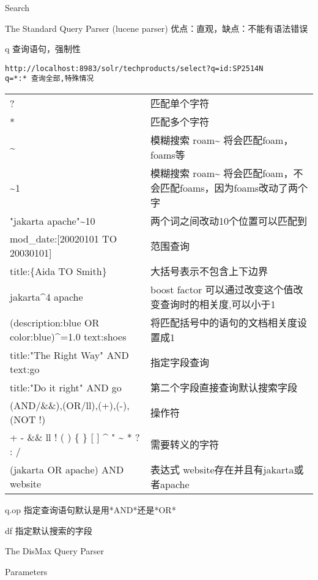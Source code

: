 \documentclass[presentation]{beamer}
\begin{document}
\begin{frame}[fragile,label={sec:org1ccf379}]{Search}
\begin{block}{The Standard Query Parser (lucene parser)}
优点：直观，缺点：不能有语法错误
\begin{block}{q}
查询语句，强制性
\begin{verbatim}
http://localhost:8983/solr/techproducts/select?q=id:SP2514N
q=*:* 查询全部,特殊情况
\end{verbatim}
\begin{center}
\begin{tabular}{ll}
? & 匹配单个字符\\
* & 匹配多个字符\\
\textasciitilde{} & 模糊搜索 roam\textasciitilde{} 将会匹配foam，foams等\\
\textasciitilde{}1 & 模糊搜索 roam\textasciitilde{} 将会匹配foam，不会匹配foams，因为foams改动了两个字\\
"jakarta apache"\textasciitilde{}10 & 两个词之间改动10个位置可以匹配到\\
mod\_date:[20020101 TO 20030101] & 范围查询\\
title:\{Aida TO Smith\} & 大括号表示不包含上下边界\\
jakarta\^{}4 apache & boost factor 可以通过改变这个值改变查询时的相关度,可以小于1\\
(description:blue OR color:blue)\^{}=1.0 text:shoes & 将匹配括号中的语句的文档相关度设置成1\\
title:"The Right Way" AND text:go & 指定字段查询\\
title:"Do it right" AND go & 第二个字段直接查询默认搜索字段\\
(AND/\&\&),(OR/ll),(+),(-),(NOT !) & 操作符\\
+ - \&\& ll ! ( ) \{ \} [ ] \^{} " \textasciitilde{} * ? : / & 需要转义的字符\\
(jakarta OR apache) AND website & 表达式 website存在并且有jakarta或者apache\\
\end{tabular}
\end{center}
\end{block}


\begin{block}{q.op}
指定查询语句默认是用*AND*还是*OR*
\end{block}


\begin{block}{df}
指定默认搜索的字段
\end{block}
\end{block}


\begin{block}{The DisMax Query Parser}
\begin{block}{Parameters}
\end{block}
\end{block}



\end{frame}
\end{document}
